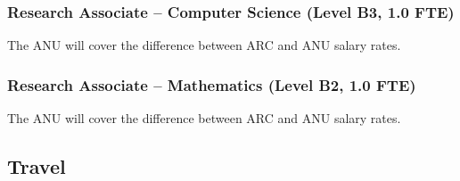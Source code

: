 \documentclass[a4paper,twoside,12pt,compact]{article}
\begin{document}
%
%




\subsubsection*{Research Associate – Computer Science (Level B3, 1.0 FTE)}

The ANU will cover the difference between ARC and ANU salary rates.


\subsubsection*{Research Associate – Mathematics (Level B2, 1.0 FTE)}

The ANU will cover the difference between ARC and ANU salary rates.





\subsection*{Travel}
\end{document}
